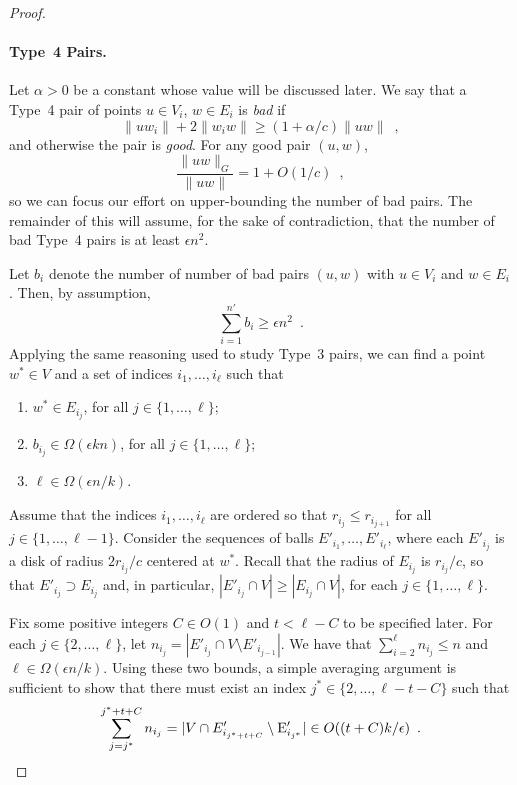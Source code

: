 \documentclass{patmorin}
\begin{document}
\begin{proof}
  \paragraph{Type~4 Pairs.}  
  Let $\alpha > 0$ be a constant whose value will be discussed later.
  We say that a Type~4 pair of points $u\in V_i$, $w\in E_i$ is
  \emph{bad} if
  \[
      \|uw_i\|+2\|w_iw\| \ge (1+\alpha/c)\|uw\| \enspace ,
  \]
  and otherwise the pair is \emph{good}.
  For any good pair $(u,w)$,
  \[
    \frac{\|uw\|_G}{\|uw\|} = 1+O(1/c) \enspace ,
  \]
  so we can focus our effort on upper-bounding the number of bad pairs.
  The remainder of this will assume, for the sake of contradiction,
  that the number of bad Type~4 pairs is at least $\epsilon n^2$.

  Let $b_i$ denote the number of number of bad pairs $(u,w)$ with
  $u\in V_i$ and $w\in E_i$.  Then, by assumption,
  \[
    \sum_{i=1}^{n'} b_i \ge \epsilon n^2 \enspace .
  \]
  Applying the same reasoning used to study Type~3 pairs, we can find a
  point $w^*\in V$ and a set of indices $i_1,\ldots,i_{\ell}$ such that
  \begin{enumerate}
    \item $w^*\in E_{i_j}$, for all $j\in\{1,\ldots,\ell\}$;
    \item $b_{i_j} \in \Omega(\epsilon kn)$, for all $j\in\{1,\ldots,\ell\}$;
    \item $\ell\in \Omega(\epsilon n/k)$.
  \end{enumerate}

  Assume that the indices $i_1,\ldots,i_\ell$ are ordered so that
  $r_{i_j}\le r_{i_{j+1}}$ for all $j\in\{1,\ldots,\ell-1\}$.  Consider
  the sequences of balls $E'_{i_1},\ldots,E'_{i_\ell}$, where each
  $E'_{i_j}$ is a disk of radius $2r_{i_j}/c$ centered at $w^*$. Recall
  that the radius of $E_{i_j}$ is $r_{i_j}/c$, so that $E'_{i_j}\supset
  E_{i_j}$ and, in particular, $|E'_{i_j}\cap V|\ge |E_{i_j}\cap V|$,
  for each $j\in\{1,\ldots,\ell\}$.

  Fix some positive integers $C\in O(1)$ and $t< \ell - C$
  to be specified later.  For each $j\in\{2,\ldots,\ell\}$, let
  $n_{i_j}=|E'_{i_j}\cap V\setminus E'_{i_{j-1}}|$. We have that
  $\sum_{i=2}^{\ell} n_{i_j} \le n$ and $\ell \in\Omega(\epsilon n/k)$.
  Using these two bounds, a simple averaging argument is sufficient
  to show that there must exist an index $j^*\in\{2,\ldots,\ell-t-C\}$
  such that
  \begin{equation}
     \sum_{j=j^*}^{j^*+t+C} n_{i_j}
        = |V\cap E'_{i_{j^*+t+C}}\setminus \E'_{i_{j^*}}| 
          \in O((t+C)k/\epsilon) \enspace . \eqlabel{sparse}
  \end{equation}



\end{proof}
\end{document}
